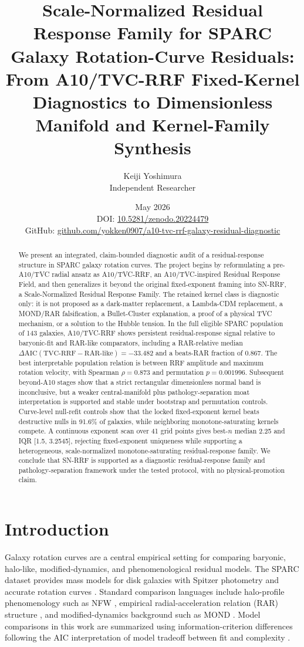 \documentclass[11pt,a4paper]{article}
\title{Scale-Normalized Residual Response Family for SPARC Galaxy Rotation-Curve Residuals:\\
From A10/TVC-RRF Fixed-Kernel Diagnostics to Dimensionless Manifold and Kernel-Family Synthesis}
\author{Keiji Yoshimura\\Independent Researcher}
\date{May 2026\\\vspace{0.25em}\small DOI: \href{https://doi.org/10.5281/zenodo.20224479}{10.5281/zenodo.20224479}\\\small GitHub: \href{https://github.com/yokken0907/a10-tvc-rrf-galaxy-residual-diagnostic}{github.com/yokken0907/a10-tvc-rrf-galaxy-residual-diagnostic}}
\newcommand{\dAIC}{\Delta\mathrm{AIC}}
\begin{document}
\maketitle

\begin{abstract}
We present an integrated, claim-bounded diagnostic audit of a residual-response structure in SPARC galaxy rotation curves. The project begins by reformulating a pre-A10/TVC radial ansatz as A10/TVC-RRF, an A10/TVC-inspired Residual Response Field, and then generalizes it beyond the original fixed-exponent framing into SN-RRF, a Scale-Normalized Residual Response Family. The retained kernel class is diagnostic only: it is not proposed as a dark-matter replacement, a Lambda-CDM replacement, a MOND/RAR falsification, a Bullet-Cluster explanation, a proof of a physical TVC mechanism, or a solution to the Hubble tension. In the full eligible SPARC population of 143 galaxies, A10/TVC-RRF shows persistent residual-response signal relative to baryonic-fit and RAR-like comparators, including a RAR-relative median $\dAIC(\mathrm{TVC\mbox{-}RRF}-\mathrm{RAR\mbox{-}like})=-33.482$ and a beats-RAR fraction of 0.867. The best interpretable population relation is between RRF amplitude and maximum rotation velocity, with Spearman $\rho=0.873$ and permutation $p=0.001996$. Subsequent beyond-A10 stages show that a strict rectangular dimensionless normal band is inconclusive, but a weaker central-manifold plus pathology-separation moat interpretation is supported and stable under bootstrap and permutation controls. Curve-level null-refit controls show that the locked fixed-exponent kernel beats destructive nulls in 91.6\% of galaxies, while neighboring monotone-saturating kernels compete. A continuous exponent scan over 41 grid points gives best-$n$ median 2.25 and IQR [1.5, 3.2545], rejecting fixed-exponent uniqueness while supporting a heterogeneous, scale-normalized monotone-saturating residual-response family. We conclude that SN-RRF is supported as a diagnostic residual-response family and pathology-separation framework under the tested protocol, with no physical-promotion claim.
\end{abstract}

\section{Introduction}
Galaxy rotation curves are a central empirical setting for comparing baryonic, halo-like, modified-dynamics, and phenomenological residual models. The SPARC dataset provides mass models for disk galaxies with Spitzer photometry and accurate rotation curves \cite{Lelli2016SPARC}. Standard comparison languages include halo-profile phenomenology such as NFW \cite{Navarro1997NFW}, empirical radial-acceleration relation (RAR) structure \cite{McGaugh2016RAR}, and modified-dynamics background such as MOND \cite{Milgrom1983MOND}. Model comparisons in this work are summarized using information-criterion differences following the AIC interpretation of model tradeoff between fit and complexity \cite{Akaike1974AIC}.
\end{document}
